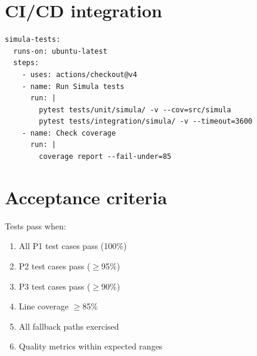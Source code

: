 \section{CI/CD integration}

\begin{lstlisting}[basicstyle=\ttfamily\small,caption={GitHub Actions workflow excerpt.}]
simula-tests:
  runs-on: ubuntu-latest
  steps:
    - uses: actions/checkout@v4
    - name: Run Simula tests
      run: |
        pytest tests/unit/simula/ -v --cov=src/simula
        pytest tests/integration/simula/ -v --timeout=3600
    - name: Check coverage
      run: |
        coverage report --fail-under=85
\end{lstlisting}

\section{Acceptance criteria}

Tests pass when:
\begin{enumerate}
  \item All P1 test cases pass (100\%)
  \item P2 test cases pass ($\geq$95\%)
  \item P3 test cases pass ($\geq$90\%)
  \item Line coverage $\geq$85\%
  \item All fallback paths exercised
  \item Quality metrics within expected ranges
\end{enumerate}